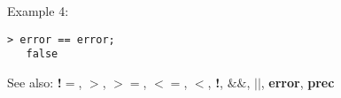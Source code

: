 \noindent Example 4: 
\begin{center}\begin{minipage}{14.8cm}\begin{Verbatim}[frame=single]
   > error == error;
   false
\end{Verbatim}
\end{minipage}\end{center}
See also: \textbf{!$=$}, \textbf{$>$}, \textbf{$>=$}, \textbf{$<=$}, \textbf{$<$}, \textbf{!}, \textbf{$\&\&$}, \textbf{$||$}, \textbf{error}, \textbf{prec}
